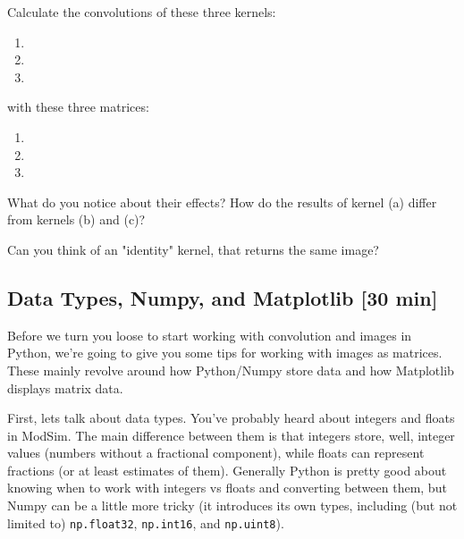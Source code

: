 \documentclass{tufte-handout}
\begin{document}
\bex
\item Calculate the convolutions of these three kernels:
    \begin{enumerate}
        \item {}
        \item {}
        \item {}
    \end{enumerate}
    with these three matrices:
    \begin{enumerate}
        \item {}
        \item {}
        \item {}
    \end{enumerate}
    What do you notice about their effects? How do the results of kernel (a)
    differ from kernels (b) and (c)?
\item Can you think of an "identity" kernel, that returns the same image?
\eex

\subsection{Data Types, Numpy, and Matplotlib [30 min]}

Before we turn you loose to start working with convolution and images in Python, we're going to give you some tips for working with images as matrices. These mainly revolve around how Python/Numpy store data and how Matplotlib displays matrix data.

First, lets talk about data types. You've probably heard about integers and floats in ModSim. The main difference between them is that integers store, well, integer values (numbers without a fractional component), while floats can represent fractions (or at least estimates of them). Generally Python is pretty good about knowing when to work with integers vs floats and converting between them, but Numpy can be a little more tricky (it introduces its own types, including (but not limited to) \lstinline{np.float32}, \lstinline{np.int16}, and \lstinline{np.uint8}).
\end{document}

